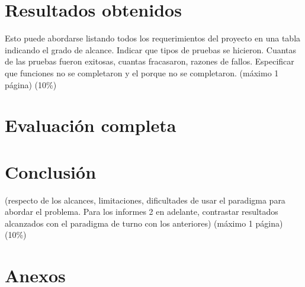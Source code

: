 \documentclass[10pt,letterpaper,openany]{article}
\begin{document}
    \section{Resultados obtenidos}
    Esto puede abordarse listando todos los requerimientos del proyecto en una tabla indicando el grado de alcance. Indicar que tipos de pruebas se hicieron. Cuantas de las pruebas fueron exitosas, cuantas fracasaron, razones de fallos. Especificar que funciones no se completaron y el porque no se completaron. (máximo 1 página) (10\%)

    \section{Evaluación completa}
    \cite{einstein}

    \section{Conclusión}
    (respecto de los alcances, limitaciones, dificultades de usar el paradigma para abordar el problema. Para los informes 2 en adelante, contrastar resultados alcanzados con el paradigma de turno con los anteriores) (máximo 1 página) (10\%)

    \newpage
    
    
    
    \section*{Anexos}
        
\end{document}
